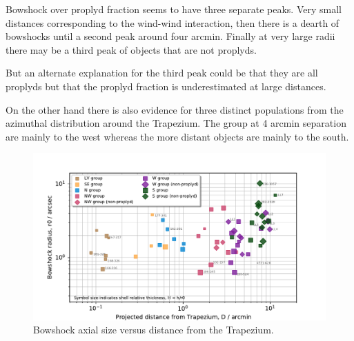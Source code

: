 \documentclass[iop, apj]{emulateapj}
\begin{document}
Bowshock over proplyd fraction seems to have three separate peaks.   Very small distances corresponding to the wind-wind interaction, then there is a dearth of bowshocks until a second peak around four arcmin.  Finally at very large radii there may be a third peak of objects that are not proplyds.

But an alternate explanation for the third peak could be that they are all proplyds but that the proplyd fraction is underestimated at large distances.

On the other hand there is also evidence for three distinct populations from the azimuthal distribution around the Trapezium.  The group at 4 arcmin separation are mainly to the west whereas the more distant objects are mainly to the south.


\begin{figure}
  \centering
  \includegraphics[width=\linewidth]{will-r0-vs-D-class}
  \caption{Bowshock axial size versus distance from the Trapezium.}
  \label{fig:size-v-distance}
\end{figure}
\end{document}

